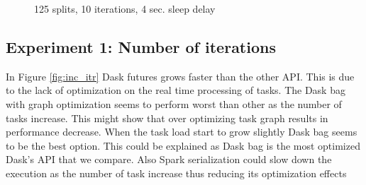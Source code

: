 \documentclass[11pt,a4paper]{article}
\begin{document}
\begin{figure}[p]
    \centering
    
    \caption{125 splits, 10 iterations, 4 sec. sleep delay}
    \label{fig:inc_node}
\end{figure}



\subsection{Experiment 1: Number of iterations}
In Figure \ref{fig:inc_itr} Dask futures grows faster than the other API. This is due
to the lack of optimization on the real time processing of tasks. The Dask bag with
graph optimization seems to perform worst than other as the number of tasks increase.
This might show that over optimizing task graph results in performance decrease. When
the task load start to grow slightly Dask bag seems to be the best option. This could
be explained as Dask bag is the most optimized Dask's API that we compare. Also Spark
serialization could slow down the execution as the number of task increase thus
reducing its optimization effects
\end{document}
